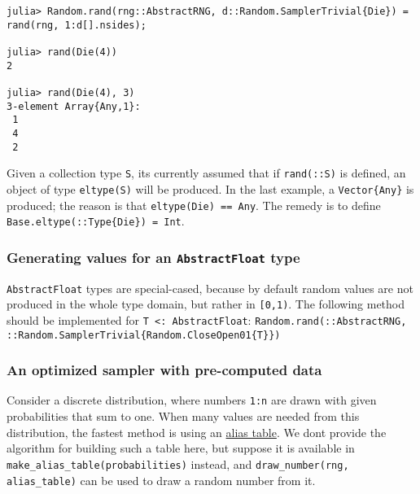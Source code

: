 \begin{verbatim}
julia> Random.rand(rng::AbstractRNG, d::Random.SamplerTrivial{Die}) = rand(rng, 1:d[].nsides);

julia> rand(Die(4))
2

julia> rand(Die(4), 3)
3-element Array{Any,1}:
 1
 4
 2
\end{verbatim}



Given a collection type \texttt{S}, it{\textquotesingle}s currently assumed that if \texttt{rand(::S)} is defined, an object of type \texttt{eltype(S)} will be produced. In the last example, a \texttt{Vector\{Any\}} is produced; the reason is that \texttt{eltype(Die) == Any}. The remedy is to define \texttt{Base.eltype(::Type\{Die\}) = Int}.



\hypertarget{1884287946239364410}{}


\subsubsection{Generating values for an \texttt{AbstractFloat} type}



\texttt{AbstractFloat} types are special-cased, because by default random values are not produced in the whole type domain, but rather in \texttt{[0,1)}. The following method should be implemented for \texttt{T <: AbstractFloat}: \texttt{Random.rand(::AbstractRNG, ::Random.SamplerTrivial\{Random.CloseOpen01\{T\}\})}



\hypertarget{11354689514356683227}{}


\subsubsection{An optimized sampler with pre-computed data}



Consider a discrete distribution, where numbers \texttt{1:n} are drawn with given probabilities that sum to one. When many values are needed from this distribution, the fastest method is using an \href{https://en.wikipedia.org/wiki/Alias\_method}{alias table}. We don{\textquotesingle}t provide the algorithm for building such a table here, but suppose it is available in \texttt{make\_alias\_table(probabilities)} instead, and \texttt{draw\_number(rng, alias\_table)} can be used to draw a random number from it.



